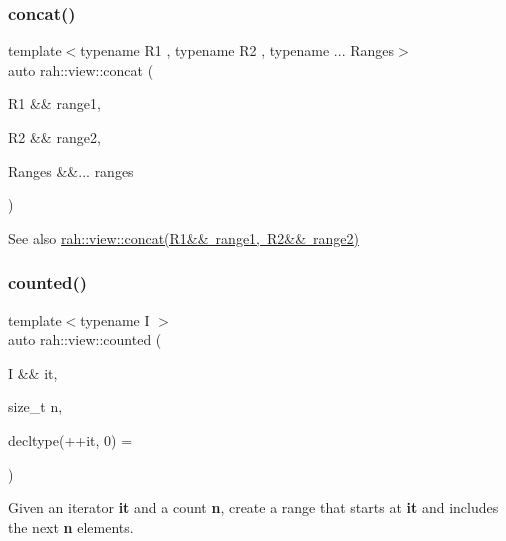 \subsubsection{\texorpdfstring{concat()}{concat()}\hspace{0.1cm}{\footnotesize\ttfamily [3/3]}}
{\footnotesize\ttfamily template$<$typename R1 , typename R2 , typename ... Ranges$>$ \\
auto rah\+::view\+::concat (\begin{DoxyParamCaption}\item[{R1 \&\&}]{range1,  }\item[{R2 \&\&}]{range2,  }\item[{Ranges \&\&...}]{ranges }\end{DoxyParamCaption})}

\begin{DoxySeeAlso}{See also}
\mbox{\hyperlink{namespacerah_1_1view_a114597b820b9ca8f3c286f026f818399}{rah\+::view\+::concat(\+R1\&\& range1, R2\&\& range2)}} 
\end{DoxySeeAlso}
\mbox{\label{namespacerah_1_1view_a9ea4acac3be1e0c4bf367c61a5252653}} 
\subsubsection{\texorpdfstring{counted()}{counted()}}
{\footnotesize\ttfamily template$<$typename I $>$ \\
auto rah\+::view\+::counted (\begin{DoxyParamCaption}\item[{I \&\&}]{it,  }\item[{size\+\_\+t}]{n,  }\item[{decltype(++it, 0)}]{ = {} }\end{DoxyParamCaption})}



Given an iterator {\bfseries{it}} and a count {\bfseries{n}}, create a range that starts at {\bfseries{it}} and includes the next {\bfseries{n}} elements. 


